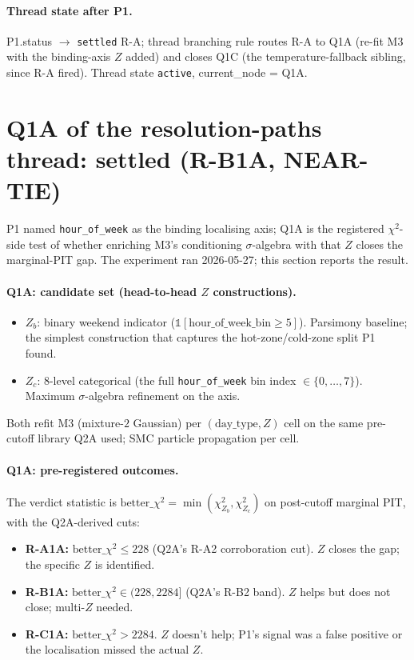 \documentclass[11pt]{article}
\theoremstyle{definition}
\theoremstyle{plain}
\begin{document}
\paragraph{Thread state after P1.}
P1.status $\to$ \texttt{settled} R-A; thread branching rule
routes R-A to Q1A (re-fit M3 with the binding-axis $Z$ added) and
closes Q1C (the temperature-fallback sibling, since R-A fired).
Thread state \texttt{active}, current\_node = Q1A.

\section{Q1A of the resolution-paths thread: settled (R-B1A, NEAR-TIE)}
\label{sec:q1a-settled}

P1 named \texttt{hour\_of\_week} as the binding localising axis;
Q1A is the registered $\chi^2$-side test of whether enriching M3's
conditioning $\sigma$-algebra with that $Z$ closes the marginal-PIT
gap. The experiment ran 2026-05-27; this section reports the result.

\paragraph{Q1A: candidate set (head-to-head $Z$ constructions).}
\begin{itemize}[leftmargin=2em]
\item $Z_b$: binary weekend indicator ($\mathbb{1}[\mathrm{hour\_of\_
week\_bin} \ge 5]$). Parsimony baseline; the simplest construction
that captures the hot-zone/cold-zone split P1 found.
\item $Z_c$: $8$-level categorical (the full \texttt{hour\_of\_week}
bin index $\in \{0, \ldots, 7\}$). Maximum $\sigma$-algebra
refinement on the axis.
\end{itemize}
Both refit M3 (mixture-$2$ Gaussian) per $(\mathrm{day\_type}, Z)$
cell on the same pre-cutoff library Q2A used; SMC particle
propagation per cell.

\paragraph{Q1A: pre-registered outcomes.}
The verdict statistic is
$\mathrm{better}\_\chi^2 = \min(\chi^2_{Z_b}, \chi^2_{Z_c})$ on
post-cutoff marginal PIT, with the Q2A-derived cuts:
\begin{itemize}[leftmargin=2em]
\item \textbf{R-A1A:} $\mathrm{better}\_\chi^2 \le 228$ (Q2A's
R-A2 corroboration cut). $Z$ closes the gap; the specific $Z$ is
identified.
\item \textbf{R-B1A:} $\mathrm{better}\_\chi^2 \in (228, 2284]$
(Q2A's R-B2 band). $Z$ helps but does not close; multi-$Z$ needed.
\item \textbf{R-C1A:} $\mathrm{better}\_\chi^2 > 2284$. $Z$
doesn't help; P1's signal was a false positive or the
localisation missed the actual $Z$.
\end{itemize}
\end{document}
